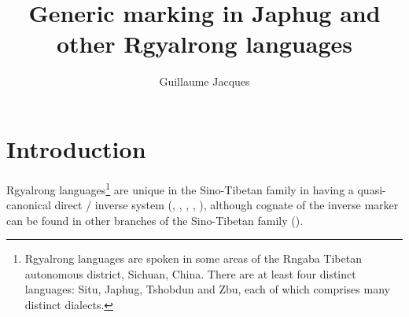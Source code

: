 \documentclass[oldfontcommands,oneside,a4paper,11pt]{article}
\begin{document}
 
\linenumbers
\title{Generic marking in Japhug and other Rgyalrong languages }
\author{Guillaume Jacques}
\maketitle
 
\section{Introduction}
Rgyalrong languages\footnote{Rgyalrong languages are spoken in some areas of the Rngaba Tibetan autonomous district, Sichuan, China. There are at least four distinct languages: Situ, Japhug, Tshobdun and Zbu, each of which comprises many distinct dialects.} are unique in the Sino-Tibetan family in having a quasi-canonical direct / inverse system (\citealt{delancey81direction}, \citealt{jackson02rentongdengdi}, \citealt{jacques10inverse}, \citealt{gongxun14agreement}, \citealt{jacques14inverse}), although  cognate of the inverse marker can be found in other branches of the Sino-Tibetan family (\citealt{delancey10agreement}).
\end{document}
